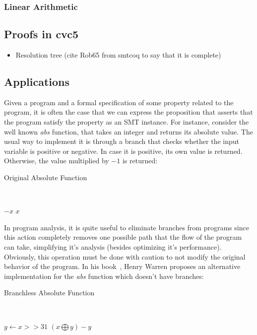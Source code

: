 \subsubsection{Linear Arithmetic}


\subsection{Proofs in cvc5}

\begin{itemize}
  \item Resolution tree (cite Rob65 from smtcoq to say that it is complete)
\end{itemize}

\subsection{Applications}

Given a program and a formal specification of some property related to the program, it is often  the case that we can express the proposition that asserts that the program satisfy the property as an SMT instance. For instance, consider the well known \textit{abs} function, that takes an integer and returns its absolute value. The usual way to implement it is through a branch that checks whether the input variable is positive or negative. In case it is positive, its own value is returned. Otherwise, the value multiplied by $-1$ is returned:

\begin{algorithm}[H]
\caption{Original Absolute Function}~\label{originalAbs}
\begin{algorithmic}
  \State\Return$-x$
\Else
  \State\Return$x$
\EndIf
\EndFunction
\end{algorithmic}
\end{algorithm}

In program analysis, it is quite useful to eliminate branches from programs since this action completely removes one possible path that the flow of the program can take, simplifying it's analysis (besides optimizing it's performance). Obviously, this operation must be done with caution to not modify the original behavior of the program. In his book~\cite{hacker_delight}, Henry Warren proposes an alternative implementation for the \textit{abs} function which doesn't have branches:

\begin{algorithm}[H]
\caption{Branchless Absolute Function}~\label{branchlessAbs}
\begin{algorithmic}
  \State $y \gets x >> 31$
  \State \Return $(x \bigoplus y) - y$
\EndFunction
\end{algorithmic}
\end{algorithm}


